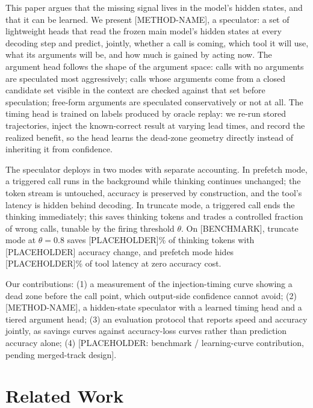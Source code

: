 \documentclass[11pt]{article}
\begin{document}
This paper argues that the missing signal lives in the model's hidden states,
and that it can be learned. We present [METHOD-NAME], a speculator: a set of
lightweight heads that read the frozen main model's hidden states at every
decoding step and predict, jointly, whether a call is coming, which tool it
will use, what its arguments will be, and how much is gained by acting now.
The argument head follows the shape of the argument space: calls with no
arguments are speculated most aggressively; calls whose arguments come from a
closed candidate set visible in the context are checked against that set
before speculation; free-form arguments are speculated conservatively or not
at all.
The timing head is trained on labels produced by oracle replay: we re-run
stored trajectories, inject the known-correct result at varying lead times,
and record the realized benefit, so the head learns the dead-zone geometry
directly instead of inheriting it from confidence.

The speculator deploys in two modes with separate accounting. In prefetch
mode, a triggered call runs in the background while thinking continues
unchanged; the token stream is untouched, accuracy is preserved by
construction, and the tool's latency is hidden behind decoding. In truncate
mode, a triggered call ends the thinking immediately; this saves thinking
tokens and trades a controlled fraction of wrong calls, tunable by the firing
threshold $\theta$. On [BENCHMARK], truncate mode at $\theta=0.8$ saves
[PLACEHOLDER]\% of thinking tokens with [PLACEHOLDER] accuracy change,
and prefetch mode hides [PLACEHOLDER]\% of tool latency at zero accuracy
cost.

Our contributions: (1) a measurement of the injection-timing curve showing a
dead zone before the call point, which output-side confidence cannot avoid;
(2) [METHOD-NAME], a hidden-state speculator with a learned timing head and a
tiered argument head; (3) an evaluation protocol that reports speed and
accuracy jointly, as savings curves against accuracy-loss curves rather than
prediction accuracy alone; (4) [PLACEHOLDER: benchmark / learning-curve
contribution, pending merged-track design].

\section{Related Work}
\end{document}
